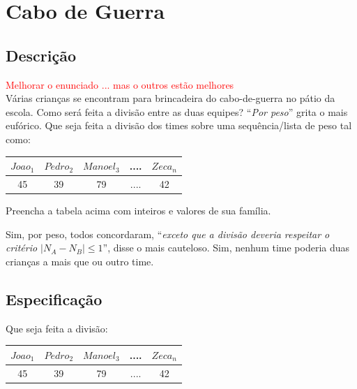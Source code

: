\section{Cabo de Guerra}

\subsection{Descrição}

\textcolor{red}{Melhorar o enunciado ... mas o outros estão melhores}\\

Várias crianças se encontram para 
 brincadeira do cabo-de-guerra no pátio da escola. Como será
 feita a divisão entre as  duas equipes?   ``{\em Por peso}''\/ grita o mais eufórico. Que seja feita a divisão dos times  sobre uma sequência/lista de peso tal como:
 
\begin{center}
\begin{tabular}{|c|c|c|c|c|}
\hline
$Joao_1$ & $Pedro_2$ & $Manoel_3$ & .... & $Zeca_n$ \\ \hline
45 & 39 & 79 & .... & 42  \\ \hline
\end{tabular}
\end{center}

 Preencha a tabela acima com inteiros e valores de sua família.

  Sim, por peso, todos concordaram,
 ``{\em exceto que a divisão deveria respeitar o critério $|N_A - N_B| \le 1$}'', disse o 
mais cauteloso. Sim, nenhum time poderia duas crianças a mais que ou outro time. 

\subsection{Especificação}

Que seja feita a divisão:

 
\begin{center}
\begin{tabular}{|c|c|c|c|c|}
\hline
$Joao_1$ & $Pedro_2$ & $Manoel_3$ & .... & $Zeca_n$ \\ \hline
45 & 39 & 79 & .... & 42  \\ \hline
\end{tabular}
\end{center}

